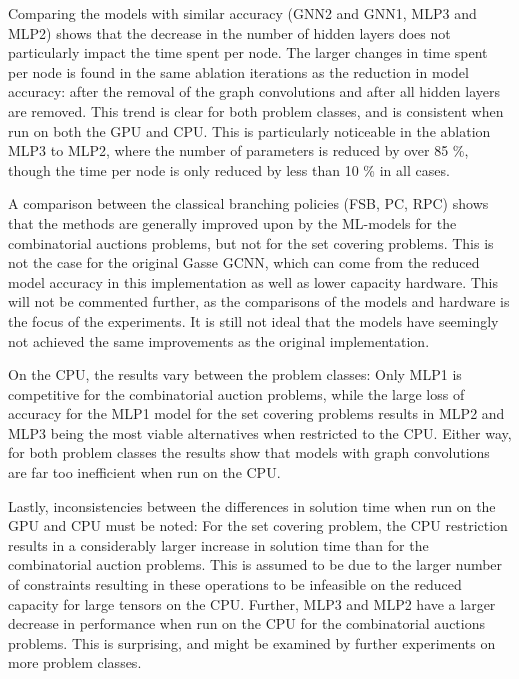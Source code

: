 Comparing the models with similar accuracy (GNN2 and GNN1, MLP3 and MLP2) shows that the decrease in the number of hidden layers does not particularly impact the time spent per node.  The larger changes in time spent per node is found in the same ablation iterations as the reduction in model accuracy: after the removal of the graph convolutions and after all hidden layers are removed. This trend is clear for both problem classes, and is consistent when run on both the \gls{GPU} and \gls{CPU}. 
This is particularly noticeable in the ablation MLP3 to MLP2, where the number of parameters is reduced by over 85 \%, though the time per node is only reduced by less than 10 \% in all cases.

A comparison between the classical branching policies (\gls{FSB}, \gls{PC}, \gls{RPC}) shows that the methods are generally improved upon by the \gls{ML}-models for the combinatorial auctions problems, but not for the set covering problems. This is not the case for the original Gasse GCNN, which can come from the reduced model accuracy in this implementation as well as lower capacity hardware. This will not be commented further, as the comparisons of the models and hardware is the focus of the experiments.
It is still not ideal that the models have seemingly not achieved the same improvements as the original implementation.

On the \gls{CPU}, the results vary between the problem classes: Only MLP1 is competitive for the combinatorial auction problems, while the large loss of accuracy for the MLP1 model for the set covering problems results in MLP2 and MLP3 being the most viable alternatives when restricted to the \gls{CPU}. Either way, for both problem classes the results show that models with graph convolutions are far too inefficient when run on the \gls{CPU}.  

Lastly, inconsistencies between the differences in solution time when run on the \gls{GPU} and \gls{CPU} must be noted: For the set covering problem, the \gls{CPU} restriction results in a considerably larger increase in solution time than for the combinatorial auction problems. This is assumed to be due to the larger number of constraints resulting in these operations to be infeasible on the reduced capacity for large tensors on the \gls{CPU}. Further, MLP3 and MLP2 have a larger decrease in performance when run on the \gls{CPU} for the combinatorial auctions problems. This is surprising, and might be examined by further experiments on more problem classes. 

